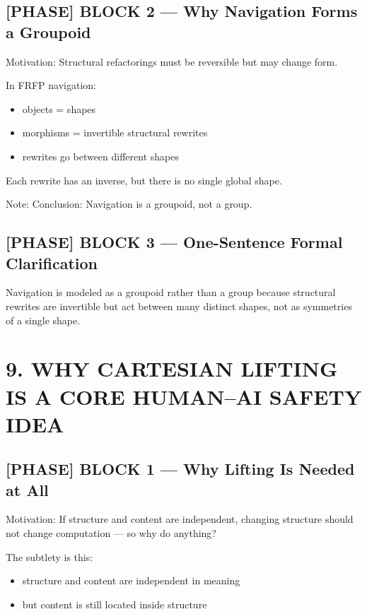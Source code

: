 \subsection*{[PHASE] BLOCK 2 --- Why Navigation Forms a Groupoid}

Motivation: Structural refactorings must be reversible but may change form.\par

In FRFP navigation:\n\n\begin{itemize}\n\item objects = shapes
\item morphisms = invertible structural rewrites
\item rewrites go between different shapes\n\end{itemize}

Each rewrite has an inverse, but there is no single global shape.\par

Note: Conclusion: Navigation is a groupoid, not a group.\par

\subsection*{[PHASE] BLOCK 3 --- One-Sentence Formal Clarification}

Navigation is modeled as a groupoid rather than a group because structural rewrites are invertible but act between many distinct shapes, not as symmetries of a single shape.\par

\section*{9. WHY CARTESIAN LIFTING IS A CORE HUMAN--AI SAFETY IDEA}

\subsection*{[PHASE] BLOCK 1 --- Why Lifting Is Needed at All}

Motivation: If structure and content are independent, changing structure should not change computation --- so why do anything?\par

The subtlety is this:\n\n\begin{itemize}\n\item structure and content are independent in meaning
\item but content is still located inside structure\n\end{itemize}

